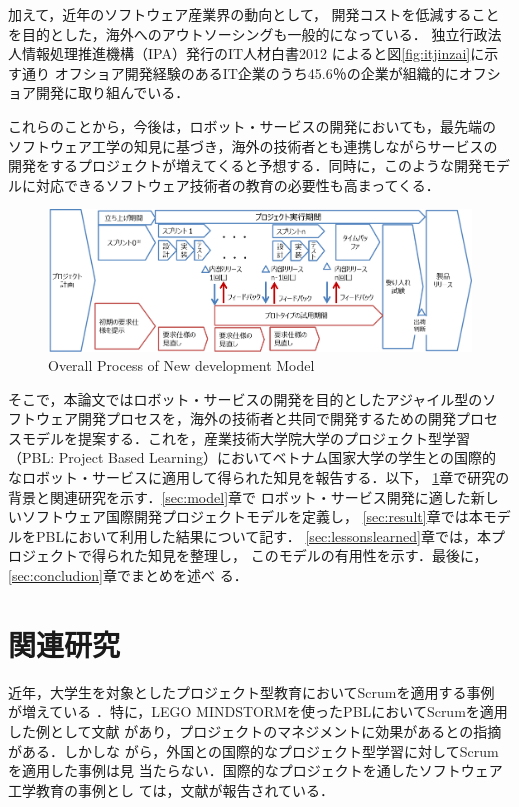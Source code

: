 \documentclass[a4j, 12Q, twocolumn, twoside]{jsarticle}
\begin{document}
加えて，近年のソフトウェア産業界の動向として，
開発コストを低減することを目的とした，海外へのアウトソーシングも一般的になっている．
独立行政法人情報処理推進機構（IPA）発行のIT人材白書2012
\cite{IT人材白書2012}
によると図\ref{fig:itjinzai}に示す通り
オフショア開発経験のあるIT企業のうち45.6％の企業が組織的にオフショア開発に取り組んでいる．

これらのことから，今後は，ロボット・サービスの開発においても，最先端の
ソフトウェア工学の知見に基づき，海外の技術者とも連携しながらサービスの
開発をするプロジェクトが増えてくると予想する．同時に，このような開発モデ
ルに対応できるソフトウェア技術者の教育の必要性も高まってくる．

\begin{figure}
  \begin{center}
    \includegraphics[width=\textwidth,trim=0mm -5mm 0mm 0mm, clip]{./figures/Process.png}
    \caption{Overall Process of New development Model}
    \label{fig:OverallProcessofNewdevelopmentMode}
  \end{center}
\end{figure}

そこで，本論文ではロボット・サービスの開発を目的としたアジャイル型のソ
フトウェア開発プロセスを，海外の技術者と共同で開発するための開発プロセ
スモデルを提案する．これを，産業技術大学院大学のプロジェクト型学習
（PBL: Project Based Learning）においてベトナム国家大学の学生との国際的
なロボット・サービスに適用して得られた知見を報告する．以下，
\ref{sec:background}章で研究の背景と関連研究を示す．\ref{sec:model}章で
ロボット・サービス開発に適した新しいソフトウェア国際開発プロジェクトモデルを定義し，
\ref{sec:result}章では本モデルをPBLにおいて利用した結果について記す．
\ref{sec:lessonslearned}章では，本プロジェクトで得られた知見を整理し，
このモデルの有用性を示す．最後に，\ref{sec:concludion}章でまとめを述べ
る．

\section{関連研究}\label{sec:background}
近年，大学生を対象としたプロジェクト型教育においてScrumを適用する事例
が増えている
\cite{mahnic2012capstone,mahnic2012students,wagh2012using,devedzic2011teaching}
．特に，LEGO MINDSTORMを使ったPBLにおいてScrumを適用した例として文献
\cite{pinto2009useofscrum}
があり，プロジェクトのマネジメントに効果があるとの指摘がある．しかしな
がら，外国との国際的なプロジェクト型学習に対してScrumを適用した事例は見
当たらない．国際的なプロジェクトを通したソフトウェア工学教育の事例とし
ては，文献\cite{de2006germany}が報告されている．
\end{document}
